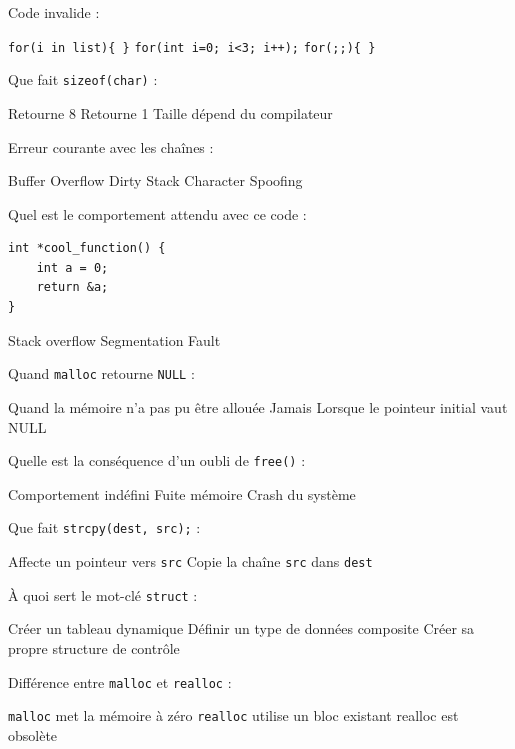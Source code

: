 \documentclass[12pt, a4paper]{exam}
\begin{document}
\begin{questions}
\question Code invalide :
\begin{checkboxes}
 \CorrectChoice \texttt{for(i in list)\{ \}}
 \choice \texttt{for(int i=0; i<3; i++);}
 \choice \texttt{for(;;)\{ \}}
\end{checkboxes}

\pagebreak{}
\question Que fait \texttt{sizeof(char)} :
\begin{checkboxes}
 \choice Retourne 8
 \CorrectChoice Retourne 1
 \choice Taille dépend du compilateur
\end{checkboxes}

\question Erreur courante avec les chaînes :
\begin{checkboxes}
 \CorrectChoice Buffer Overflow
 \choice Dirty Stack
 \choice Character Spoofing
\end{checkboxes}

\question Quel est le comportement attendu avec ce code :
\begin{verbatim}
int *cool_function() {
    int a = 0;
    return &a;
}
\end{verbatim}
\begin{checkboxes}
 \choice Stack overflow
 \CorrectChoice Segmentation Fault
\end{checkboxes}

\question Quand \texttt{malloc} retourne \texttt{NULL} :
\begin{checkboxes}
 \CorrectChoice Quand la mémoire n’a pas pu être allouée
 \choice Jamais
 \choice Lorsque le pointeur initial vaut NULL
\end{checkboxes}

\question Quelle est la conséquence d’un oubli de \texttt{free()} :
\begin{checkboxes}
 \choice Comportement indéfini
 \CorrectChoice Fuite mémoire
 \choice Crash du système
\end{checkboxes}

\question Que fait \texttt{strcpy(dest, src);} :
\begin{checkboxes}
 \choice Affecte un pointeur vers \texttt{src}
 \CorrectChoice Copie la chaîne \texttt{src} dans \texttt{dest}
\end{checkboxes}

\question À quoi sert le mot-clé \texttt{struct} :
\begin{checkboxes}
 \choice Créer un tableau dynamique
 \CorrectChoice Définir un type de données composite
 \choice Créer sa propre structure de contrôle
\end{checkboxes}

\question Différence entre \texttt{malloc} et \texttt{realloc} :
\begin{checkboxes}
 \choice \texttt{malloc} met la mémoire à zéro
 \CorrectChoice \texttt{realloc} utilise un bloc existant
 \choice realloc est obsolète
\end{checkboxes}

\end{questions}
\end{document}
